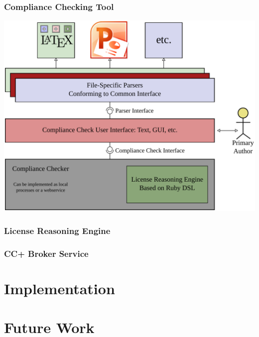 \documentclass[mathserif,xcolor=dvipsnames,hyperref={bookmarks=true}]{beamer}
\begin{document}
    \begin{frame}[t]
        \frametitle{Compliance Checking Tool}
        \begin{center}
            \includegraphics[width=0.9\textheight]{compliance-checking-tool.pdf}
        \end{center}
    \end{frame}

    \begin{frame}[t]
        \frametitle{License Reasoning Engine}
    \end{frame}

    \begin{frame}[t]
        \frametitle{CC+ Broker Service}
    \end{frame}

\section{Implementation}
\begin{frame}[t]
\end{frame}

\section{Future Work}
\begin{frame}[t]
\end{frame}
\end{document}
